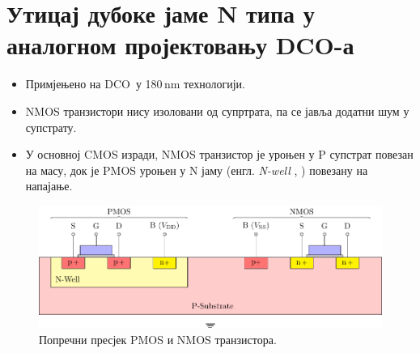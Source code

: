 \documentclass[aspectratio=169]{beamer}
\makeatletter
\newcommand*{\engl}[2][\@empty]{%
    \edef\theacronym{#1}%
    (енгл. \foreignlanguage{english}{\emph{#2}%
    \ifx\theacronym\@empty \else , #1\fi})%
}
\def \DCO  {DCO} %
\makeatother
\begin{document}
\section{Утицај дубоке јаме N типа у аналогном пројектовању \DCO-а}

\begin{frame}{\secname}
	\begin{itemize}
		\item Примјењено на \DCO\ у 180\,nm технологији.
		\item NMOS транзистори нису изоловани од супртрата, па се јавља додатни шум у супстрату.
		\item У основној CMOS изради, NMOS транзистор је уроњен у P супстрат повезан на масу, док је PMOS уроњен у N јаму \engl{N-well} повезану на напајање.
	\end{itemize}
        \begin{figure}[!t]
        	\centering
            	\includegraphics[scale=0.8]{slike/prezentacija/dnw1.pdf}
		\caption{Попречни пресјек PMOS и NMOS транзистора.}
        \end{figure}
\end{frame}
\end{document}
